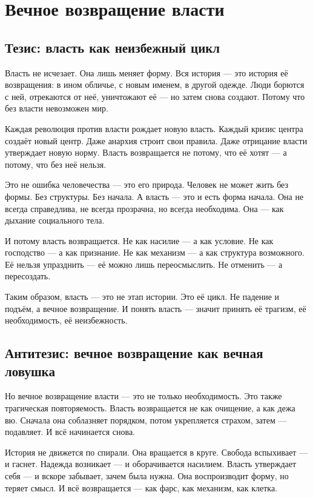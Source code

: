 \chapter{Вечное возвращение власти}

\section{Тезис: власть как неизбежный цикл}

Власть не исчезает. Она лишь меняет форму. Вся история — это история её возвращения: в ином обличье, с новым именем, в другой одежде. Люди борются с ней, отрекаются от неё, уничтожают её — но затем снова создают. Потому что без власти невозможен мир.

Каждая революция против власти рождает новую власть. Каждый кризис центра создаёт новый центр. Даже анархия строит свои правила. Даже отрицание власти утверждает новую норму. Власть возвращается не потому, что её хотят — а потому, что без неё нельзя.

Это не ошибка человечества — это его природа. Человек не может жить без формы. Без структуры. Без начала. А власть — это и есть форма начала. Она не всегда справедлива, не всегда прозрачна, но всегда необходима. Она — как дыхание социального тела.

И потому власть возвращается. Не как насилие — а как условие. Не как господство — а как признание. Не как механизм — а как структура возможного. Её нельзя упразднить — её можно лишь переосмыслить. Не отменить — а пересоздать.

Таким образом, власть — это не этап истории. Это её цикл. Не падение и подъём, а вечное возвращение. И понять власть — значит принять её трагизм, её необходимость, её неизбежность.

\section{Антитезис: вечное возвращение как вечная ловушка}

Но вечное возвращение власти — это не только необходимость. Это также трагическая повторяемость. Власть возвращается не как очищение, а как дежа вю. Сначала она соблазняет порядком, потом укрепляется страхом, затем — подавляет. И всё начинается снова.

История не движется по спирали. Она вращается в круге. Свобода вспыхивает — и гаснет. Надежда возникает — и оборачивается насилием. Власть утверждает себя — и вскоре забывает, зачем была нужна. Она воспроизводит форму, но теряет смысл. И всё возвращается — как фарс, как механизм, как клетка.

